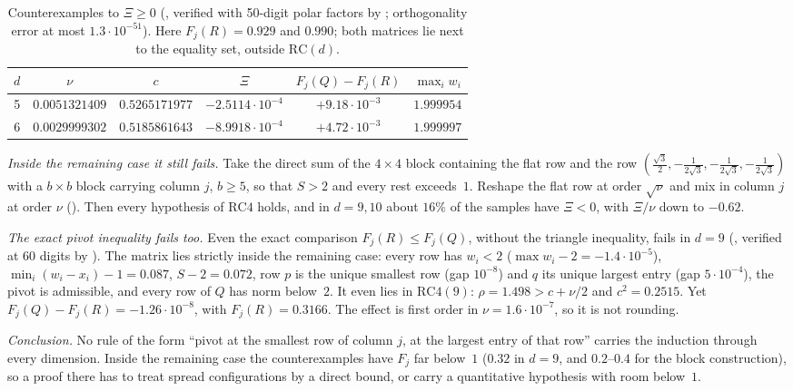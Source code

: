 \documentclass[11pt,a4paper]{article}
\begin{document}
\begin{table}[t]
\centering\small
\begin{tabular}{c c c c c c}
\toprule
$d$ & $\nu$ & $c$ & $\Xi$ & $F_j(Q)-F_j(R)$ & $\max_i w_i$ \\
\midrule
5 & $0.0051321409$ & $0.5265171977$ & $-2.5114\cdot10^{-4}$ & $+9.18\cdot10^{-3}$ & $1.999954$ \\
6 & $0.0029999302$ & $0.5185861643$ & $-8.9918\cdot10^{-4}$ & $+4.72\cdot10^{-3}$ & $1.999997$ \\
\bottomrule
\end{tabular}
\caption{Counterexamples to $\Xi\ge0$ (, verified with 50-digit polar factors by ; orthogonality error at most $1.3\cdot10^{-51}$). Here $F_j(R)=0.929$ and $0.990$; both matrices lie next to the equality set, outside $\mathrm{RC}(d)$.}
\label{tab:pivotcex}
\end{table}

\emph{Inside the remaining case it still fails.} Take the direct sum of the $4\times4$ block containing the flat row and the row $(\frac{\sqrt3}2,-\frac1{2\sqrt3},-\frac1{2\sqrt3},-\frac1{2\sqrt3})$ with a $b\times b$ block carrying column $j$, $b\ge5$, so that $S>2$ and every rest exceeds~$1$. Reshape the flat row at order $\sqrt\nu$ and mix in column $j$ at order $\nu$ (). Then every hypothesis of $\mathrm{RC4}$ holds, and in $d=9,10$ about $16\%$ of the samples have $\Xi<0$, with $\Xi/\nu$ down to $-0.62$.

\emph{The exact pivot inequality fails too.} Even the exact comparison $F_j(R)\le F_j(Q)$, without the triangle inequality, fails in $d=9$ (, verified at 60 digits by ). The matrix lies strictly inside the remaining case: every row has $w_i<2$ ($\max w_i-2=-1.4\cdot10^{-5}$), $\min_i(w_i-x_i)-1=0.087$, $S-2=0.072$, row $p$ is the unique smallest row (gap $10^{-8}$) and $q$ its unique largest entry (gap $5\cdot10^{-4}$), the pivot is admissible, and every row of $Q$ has norm below~$2$. It even lies in $\mathrm{RC4}(9)$: $\rho=1.498>c+\nu/2$ and $c^2=0.2515$. Yet $F_j(Q)-F_j(R)=-1.26\cdot10^{-8}$, with $F_j(R)=0.3166$. The effect is first order in $\nu=1.6\cdot10^{-7}$, so it is not rounding.

\emph{Conclusion.} No rule of the form ``pivot at the smallest row of column $j$, at the largest entry of that row'' carries the induction through every dimension. Inside the remaining case the counterexamples have $F_j$ far below~$1$ ($0.32$ in $d=9$, and $0.2$--$0.4$ for the block construction), so a proof there has to treat spread configurations by a direct bound, or carry a quantitative hypothesis with room below~$1$.
\end{document}
